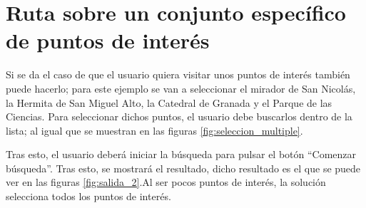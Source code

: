 \section[Caso 2]{Ruta sobre un conjunto específico de puntos de interés}
Si se da el caso de que el usuario quiera visitar unos puntos de interés también puede hacerlo; para este ejemplo se van a seleccionar el mirador de San Nicolás, la Hermita de San Miguel Alto, la Catedral de Granada y el Parque de las Ciencias. Para seleccionar dichos puntos, el usuario debe buscarlos dentro de la lista; al igual que se muestran en las figuras \ref{fig:seleccion_multiple}.\newline

Tras esto, el usuario deberá iniciar la búsqueda para pulsar el botón \enquote{Comenzar búsqueda}. Tras esto, se mostrará el resultado, dicho resultado es el que se puede ver en las figuras \ref{fig:salida_2}.Al ser pocos puntos de interés, la solución selecciona todos los puntos de interés.\newline

